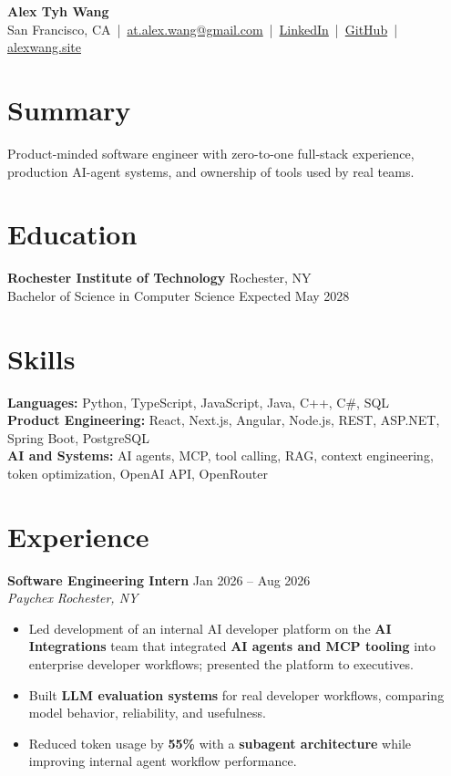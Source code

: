 \documentclass[10pt,letterpaper]{article}
\newif\ifresumeFirstRole
\newcommand{\resumeRole}[4]{%
  \ifresumeFirstRole
    \global\resumeFirstRolefalse
  \else
    \vspace{0pt plus 1fill}%
  \fi
  \textbf{#1} \hfill #2\\
  \textit{#3} \hfill \textit{#4}
}
\begin{document}
\begin{center}
{\Large \textbf{Alex Tyh Wang}}\\
San Francisco, CA \,|\, \href{mailto:at.alex.wang@gmail.com}{at.alex.wang@gmail.com} \,|\, \href{https://www.linkedin.com/in/alex-tyh-wang/}{LinkedIn} \,|\, \href{https://github.com/alextyhwang}{GitHub} \,|\, \href{https://alexwang.site}{alexwang.site}
\end{center}

\section*{Summary}
Product-minded software engineer with zero-to-one full-stack experience, production AI-agent systems, and ownership of tools used by real teams.

\section*{Education}
\textbf{Rochester Institute of Technology} \hfill Rochester, NY\\
Bachelor of Science in Computer Science \hfill Expected May 2028

\section*{Skills}
\textbf{Languages:} Python, TypeScript, JavaScript, Java, C++, C\#, SQL\\
\textbf{Product Engineering:} React, Next.js, Angular, Node.js, REST, ASP.NET, Spring Boot, PostgreSQL\\
\textbf{AI and Systems:} AI agents, MCP, tool calling, RAG, context engineering, token optimization, OpenAI API, OpenRouter

\section*{Experience}
\resumeRole{Software Engineering Intern}{Jan 2026 -- Aug 2026}{Paychex}{Rochester, NY}
\begin{itemize}
  \item Led development of an internal AI developer platform on the \textbf{AI Integrations} team that integrated \textbf{AI agents and MCP tooling} into enterprise developer workflows; presented the platform to executives.
  \item Built \textbf{LLM evaluation systems} for real developer workflows, comparing model behavior, reliability, and usefulness.
  \item Reduced token usage by \textbf{55\%} with a \textbf{subagent architecture} while improving internal agent workflow performance.
\end{itemize}
\end{document}
